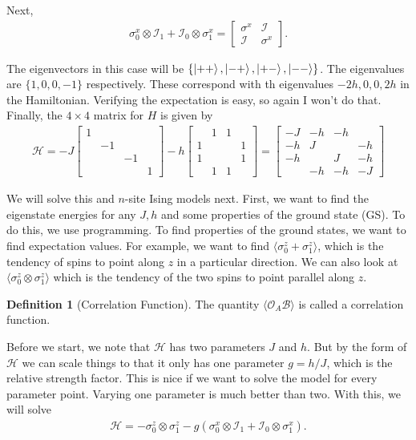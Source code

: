 \documentclass{book}
\theoremstyle{definition}
\newtheorem{defn}{Definition}[section]
\newcommand{\had}{\mathcal{H}}
\newcommand{\lp}{\left(}
\newcommand{\rp}{\right)}
\newcommand{\Id}{\mathcal{I}}
\begin{document}
Next, 
\begin{align}
\sigma_0^x\otimes \Id_1 + \Id_0 \otimes \sigma_1^x = \begin{bmatrix}
\sigma^x & \Id \\ \Id & \sigma^x
\end{bmatrix}.
\end{align}

The eigenvectors in this case will be $\{ \ket{++}, \ket{-+}, \ket{+-}, \ket{--}  \}$. The eigenvalues are $\{1,0,0,-1\}$ respectively. These correspond with th eigenvalues $-2h,0,0,2h$ in the Hamiltonian. Verifying the expectation is easy, so again I won't do that.\\

Finally, the $4\times 4$ matrix for $H$ is given by
\begin{align}
\had = -J\begin{bmatrix}
1&&&\\&-1&&\\&&-1&\\&&&1
\end{bmatrix} - h\begin{bmatrix}
&1&1&\\1&&&1\\1&&&1\\&1&1&
\end{bmatrix} = \begin{bmatrix}
-J&-h&-h&\\-h&J&&-h\\-h&&J&-h\\&-h&-h&-J
\end{bmatrix}
\end{align}

We will solve this and $n$-site Ising models next. First, we want to find the eigenstate energies for any $J,h$ and some properties of the ground state (GS). To do this, we use programming. To find properties of the ground states, we want to find expectation values. For example, we want to find $\langle \sigma^z_0 + \sigma_1^z \rangle $, which is the tendency of spins to point along $z$ in a particular direction. We can also look at $\langle \sigma_0^z \otimes \sigma_1^z \rangle$ which is the tendency of the two spins to point parallel along $z$. 

\begin{defn}[Correlation Function]
	The quantity $\langle \mathcal{O}_A \mathcal{B}\rangle$ is called a correlation function. 
\end{defn}

Before we start, we note that $\had$ has two parameters $J$ and $h$. But by the form of $\had$ we can scale things to that it only has one parameter $g = h/J$, which is the relative strength factor. This is nice if we want to solve the model for every parameter point. Varying one parameter is much better than two. With this, we will solve
\begin{align}
\had = -\sigma^z_0 \otimes \sigma_1^z  - g\lp \sigma_0^x\otimes \Id_1 + \Id_0 \otimes \sigma_1^x \rp.
\end{align}
\end{document}
